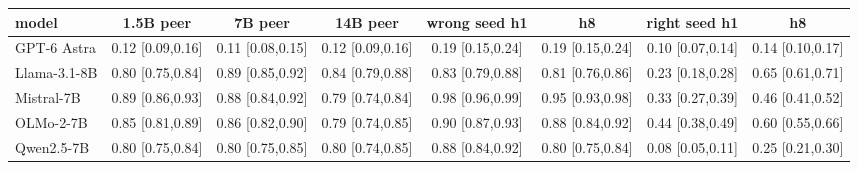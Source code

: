 \begin{tabular}{lccc|cc|cc}
\toprule
model & 1.5B peer & 7B peer & 14B peer & wrong seed h1 & h8 & right seed h1 & h8 \\
\midrule
GPT-6 Astra & 0.12 [0.09,0.16] & 0.11 [0.08,0.15] & 0.12 [0.09,0.16] & 0.19 [0.15,0.24] & 0.19 [0.15,0.24] & 0.10 [0.07,0.14] & 0.14 [0.10,0.17] \\
Llama-3.1-8B & 0.80 [0.75,0.84] & 0.89 [0.85,0.92] & 0.84 [0.79,0.88] & 0.83 [0.79,0.88] & 0.81 [0.76,0.86] & 0.23 [0.18,0.28] & 0.65 [0.61,0.71] \\
Mistral-7B & 0.89 [0.86,0.93] & 0.88 [0.84,0.92] & 0.79 [0.74,0.84] & 0.98 [0.96,0.99] & 0.95 [0.93,0.98] & 0.33 [0.27,0.39] & 0.46 [0.41,0.52] \\
OLMo-2-7B & 0.85 [0.81,0.89] & 0.86 [0.82,0.90] & 0.79 [0.74,0.85] & 0.90 [0.87,0.93] & 0.88 [0.84,0.92] & 0.44 [0.38,0.49] & 0.60 [0.55,0.66] \\
Qwen2.5-7B & 0.80 [0.75,0.84] & 0.80 [0.75,0.85] & 0.80 [0.74,0.85] & 0.88 [0.84,0.92] & 0.80 [0.75,0.84] & 0.08 [0.05,0.11] & 0.25 [0.21,0.30] \\
\bottomrule
\end{tabular}
